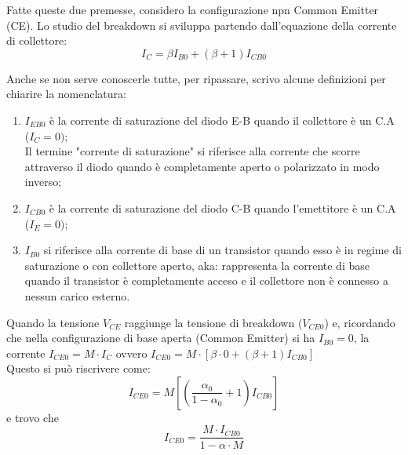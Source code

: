 %
\newpage
Fatte queste due premesse, considero la configurazione npn Common Emitter (CE). Lo studio del breakdown si sviluppa partendo dall'equazione della corrente di collettore:
%
\begin{equation*}
    I_C=\beta I_{B0} + (\beta+1)I_{CB0}
\end{equation*}
\begin{ripasso}
Anche se non serve conoscerle tutte, per ripassare, scrivo alcune definizioni per chiarire la nomenclatura: 
    \begin{enumerate}
        \item $I_{EB0}$ è la corrente di saturazione del diodo E-B quando il collettore è un C.A ($I_C=0)$; \\Il termine "corrente di saturazione" si riferisce alla corrente che scorre attraverso il diodo quando è completamente aperto o polarizzato in modo inverso;
        \item $I_{CB0}$ è la corrente di saturazione del diodo C-B quando l'emettitore è un C.A ($I_E=0)$;
        \item $I_{B0}$ si riferisce alla corrente di base di un transistor quando esso è in regime di saturazione o con collettore aperto, aka:  rappresenta la corrente di base quando il transistor è completamente acceso e il collettore non è connesso a nessun carico esterno.
    \end{enumerate}
\end{ripasso}
%
Quando la tensione $V_{CE}$ raggiunge la tensione di breakdown ($V_{CE0}$) e, ricordando che nella configurazione di base aperta (Common Emitter) si ha $I_{B0}=0$, la corrente $I_{CE0} = M\cdot I_{C}$ ovvero $I_{CE0}=M \cdot [\beta \cdot 0 +(\beta+1) I_{CB0}]$\\
Questo si può riscrivere come:
%
\begin{equation}
    I_{CE0}= M\left[\left(\dfrac{\alpha_0}{1-\alpha_0}+1\right) I_{CB0}\right]
\end{equation}
%
e trovo che
%
\begin{equation}
    I_{CE0}=\dfrac{M\cdot I_{CB0}}{1-\alpha\cdot M}
\end{equation}
%

